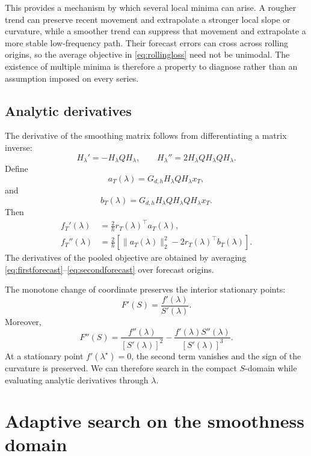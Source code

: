 \documentclass[english]{smcca}
\begin{document}
This provides a mechanism by which several local minima can arise. A rougher
trend can preserve recent movement and extrapolate a stronger local slope or
curvature, while a smoother trend can suppress that movement and extrapolate a
more stable low-frequency path. Their forecast errors can cross across rolling
origins, so the average objective in \eqref{eq:rollingloss} need not be unimodal.
The existence of multiple minima is therefore a property to diagnose rather
than an assumption imposed on every series.

\subsection{Analytic derivatives}

The derivative of the smoothing matrix follows from differentiating a matrix inverse:
\[
H_\lambda'
=
-H_\lambda QH_\lambda,
\qquad
H_\lambda''
=
2H_\lambda QH_\lambda QH_\lambda.
\]
Define
\[
a_T(\lambda)
=
G_{d,h}H_\lambda QH_\lambda x_T,
\]
and
\[
b_T(\lambda)
=
G_{d,h}H_\lambda QH_\lambda QH_\lambda x_T.
\]
Then
\begin{align}
f_T'(\lambda)
&=
\frac{2}{h}r_T(\lambda)^\top a_T(\lambda),
\label{eq:firstforecast}
\\
f_T''(\lambda)
&=
\frac{2}{h}
\left[
\|a_T(\lambda)\|_2^2
-
2r_T(\lambda)^\top b_T(\lambda)
\right].
\label{eq:secondforecast}
\end{align}
The derivatives of the pooled objective are obtained by averaging \eqref{eq:firstforecast}--\eqref{eq:secondforecast} over forecast origins.

The monotone change of coordinate preserves the interior stationary points:
\begin{equation}
F'(S)
=
\frac{f'(\lambda)}{S'(\lambda)}.
\label{eq:chainfirst}
\end{equation}
Moreover,
\begin{equation}
F''(S)
=
\frac{f''(\lambda)}{[S'(\lambda)]^2}
-
\frac{f'(\lambda)S''(\lambda)}{[S'(\lambda)]^3}.
\label{eq:chainsecond}
\end{equation}
At a stationary point \(f'(\lambda^\star)=0\), the second term vanishes and the sign of the curvature is preserved. We can therefore search in the compact \(S\)-domain while evaluating analytic derivatives through \(\lambda\).

\section{Adaptive search on the smoothness domain}
\end{document}
